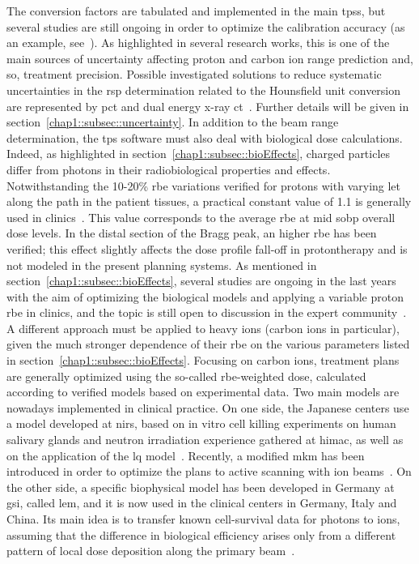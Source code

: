 The conversion factors are tabulated and implemented in the main \glspl{tps}, but several studies are still ongoing in order to optimize the calibration accuracy (as an example, see~\cite{Inaniwa2018}). As highlighted in several research works, this is one of the main sources of uncertainty affecting proton and carbon ion range prediction and, so, treatment precision. Possible investigated solutions to reduce systematic uncertainties in the \gls{rsp} determination related to the Hounsfield unit conversion are represented by \gls{pct} and dual energy x-ray \gls{ct}~\parencite{Yang2010}. Further details will be given in section~\ref{chap1::subsec::uncertainty}.
In addition to the beam range determination,  the \gls{tps} software must also deal with biological dose calculations. Indeed, as highlighted in section~\ref{chap1::subsec::bioEffects}, charged particles differ from photons in their radiobiological properties and effects. Notwithstanding the 10-20\% \gls{rbe} variations verified for protons with varying \gls{let} along the path in the patient tissues, a practical constant value of 1.1 is generally used in clinics~\parencite{Paganetti2002, ICRU2007}. This value corresponds to the average \gls{rbe} at mid \gls{sobp} overall dose levels. In the distal section of the Bragg peak, an higher \gls{rbe} has been verified; this effect slightly affects the dose profile fall-off in protontherapy and is not modeled in the present planning systems. As mentioned in section~\ref{chap1::subsec::bioEffects}, several studies are ongoing in the last years with the aim of optimizing the biological models and applying a variable proton \gls{rbe} in clinics, and the topic is still open to discussion in the expert community~\parencite{Paganetti2013, Paganetti2014, Unkelbach2018, Luhr2018, Willers2018}. A different approach must be applied to heavy ions (carbon ions in particular), given the much stronger dependence of their \gls{rbe} on the various parameters listed in section~\ref{chap1::subsec::bioEffects}. Focusing on carbon ions, treatment plans are generally optimized using the so-called \gls{rbe}-weighted dose, calculated according to verified models based on experimental data. Two main models are nowadays implemented in clinical practice. On one side, the Japanese centers use a model developed at \gls{nirs}, based on in vitro cell killing experiments on human salivary glands and neutron irradiation experience gathered at \gls{himac}, as well as on the application of the \gls{lq} model~\parencite{Matsufuji2007}. Recently, a modified \gls{mkm} has been introduced in order to optimize the plans to active scanning with ion beams~\parencite{Inaniwa2015}. On the other side, a specific biophysical model has been developed in Germany at \gls{gsi}, called \gls{lem}, and it is now used in the clinical centers in Germany, Italy and China. Its main idea is to transfer known cell-survival data for photons to ions, assuming that the difference in biological efficiency arises only from a different pattern of local dose deposition along the primary beam~\parencite{Kramer2000, Jakel2001a}.
